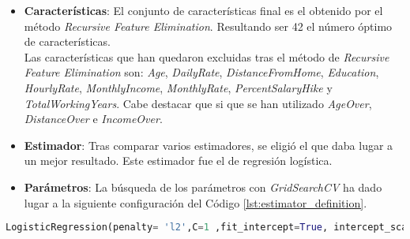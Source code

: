 \begin{itemize}
	\item \textbf{Características}: El conjunto de características final es el obtenido por el método \textit{Recursive Feature Elimination}. Resultando ser 42 el número óptimo de características.\\
	
			Las características que han quedaron excluidas tras el método de \textit{Recursive Feature Elimination} son: \textit{Age}, \textit{DailyRate}, \textit{DistanceFromHome}, \textit{Education}, \textit{HourlyRate}, \textit{MonthlyIncome}, 		\textit{MonthlyRate}, 	\textit{PercentSalaryHike} y  \textit{TotalWorkingYears}. Cabe destacar que si que se han utilizado \textit{AgeOver}, \textit{DistanceOver} e \textit{IncomeOver}.\\
			
	\item \textbf{Estimador}: Tras comparar varios estimadores, se eligió el que daba lugar a un mejor resultado. Este estimador fue el de regresión logística.
	
	\item \textbf{Parámetros}: La búsqueda de los parámetros con \textit{GridSearchCV} ha dado lugar a la siguiente configuración del Código \ref{lst:estimator_definition}.\\




\end{itemize}

\begin{lstlisting}[language=python, breaklines, caption={Declaración del estimador},label={lst:estimator_definition}]
	LogisticRegression(penalty= 'l2',C=1 ,fit_intercept=True, intercept_scaling=0.1, tol=0.001, class_weight=None)
\end{lstlisting}




